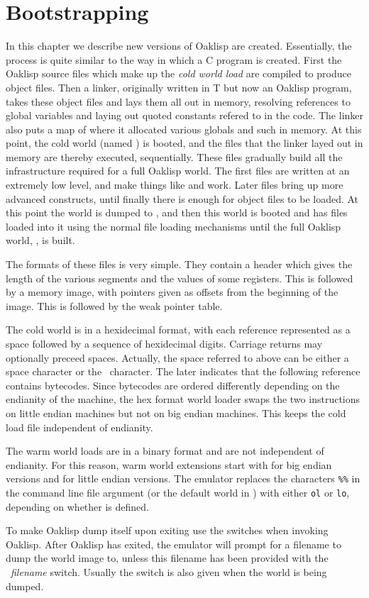 \chapter{Bootstrapping}

In this chapter we describe new versions of Oaklisp are created.
Essentially, the process is quite similar to the way in which a C
program is created.  First the Oaklisp source files which make up the
\emph{cold world load} are compiled to produce object files.  Then a
linker, originally written in T but now an Oaklisp program, takes
these object files and lays them all out in memory, resolving
references to global variables and laying out quoted constants refered
to in the code.  The linker also puts a map of where it allocated
various globals and such in memory.  At this point, the cold world
(named ) is booted, and the files that the linker
layed out in memory are thereby executed, sequentially.  These files
gradually build all the infrastructure required for a full Oaklisp
world.  The first files are written at an extremely low level, and
make things like  and  work.  Later files bring up
more advanced constructs, until finally there is enough for object
files to be loaded.  At this point the world is dumped to
, and then this world is booted and has files loaded
into it using the normal file loading mechanisms until the full
Oaklisp world, , is built.

The formats of these files is very simple.  They contain a header
which gives the length of the various segments and the values of some
registers.  This is followed by a memory image, with pointers given as
offsets from the beginning of the image.  This is followed by the weak
pointer table.

The cold world is in a hexidecimal format, with each reference
represented as a space followed by a sequence of hexidecimal digits.
Carriage returns may optionally preceed spaces.  Actually, the space
referred to above can be either a space character or the \upar\
character.  The later indicates that the following reference contains
bytecodes.  Since bytecodes are ordered differently depending on the
endianity of the machine, the hex format world loader swaps the two
instructions on little endian machines but not on big endian machines.
This keeps the cold load file independent of endianity.

The warm world loads are in a binary format and are not independent
of endianity.  For this reason, warm world extensions start with
\df{.ol} for big endian versions and \df{.lo} for little endian
versions.  The emulator replaces the characters \texttt{\%\%} in the
command line file argument (or the default world in \df{config.h})
with either \texttt{ol} or \texttt{lo}, depending on whether
 is defined.

To make Oaklisp dump itself upon exiting use the  
switches when invoking Oaklisp.  After Oaklisp has exited, the
emulator will prompt for a filename to dump the world image to, unless
this filename has been provided with the \dfsw{-f}~\emph{filename}
switch.  Usually the \dfsw{-G} switch is also given when the world is
being dumped.
